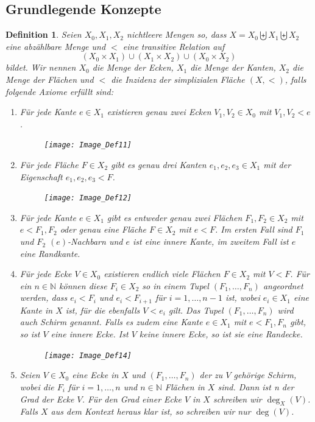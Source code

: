 \documentclass[12pt,titlepage,twoside,cleardoublepage]{article}
\theoremstyle{nummermitklammern}
\newtheorem{definition}[temp]{Definition}
\newtheorem{definition}[zahl]{Definition}
\numberwithin{equation}{section}
\begin{document}
\subsection{Grundlegende Konzepte}
\begin{definition}  \label{def1} 
Seien $X_0,X_1,X_2$ nichtleere Mengen so, dass $X=X_{0} \biguplus X_{1} \biguplus X_{2}$ eine abzählbare Menge und $<$ eine transitive Relation auf   
\[
(X_{0}\times X_{1}) \cup (X_{1}\times X_{2})\cup (X_{0}\times X_{2})
\]
 bildet.
 Wir nennen $X_{0}$ \emph{die Menge der Ecken}, $X_{1}$ \emph{die Menge der Kanten}, $X_{2}$ \emph{die Menge der Flächen} und $<$ die \emph{Inzidenz} der \emph{simplizialen Fläche} $(X,<)$, falls folgende Axiome erfüllt sind:
 \begin{enumerate}
\item Für jede Kante $e \in X_{1}$ existieren genau zwei Ecken $V_1,V_2 \in X_{0}$ mit $V_1,V_2 < e$. 
\begin{figure}[H]
\begin{center}
\texttt{[image: Image\_Def11]}
\end{center}
\end{figure}
\item Für jede Fläche $F\in X_2$ gibt es genau drei Kanten $e_1,e_2,e_3 \in X_{1}$ mit der Eigenschaft $e_1,e_2,e_3 < F$.
\begin{figure}[H]
\begin{center}
\texttt{[image: Image\_Def12]}
\end{center}
\end{figure} 
\item Für jede Kante $e \in X_{1}$ gibt es entweder genau zwei Flächen $F_{1},F_{2} \in X_{2}$ mit $e <F_{1},F_2$ oder
genau eine Fläche $F \in X_{2}$ mit $e < F$. Im ersten Fall sind $F_{1}$ und $F_{2}$ \emph{$(e)$-Nachbarn} und $e$ ist eine \emph{innere Kante}, im zweitem Fall ist $e$ eine \emph{Randkante}. 
 \item Für jede Ecke $V \in X_{0}$ existieren endlich viele Flächen $F\in X_{2}$ mit $V < F$.
  Für ein $n\in \mathbb{N}$ können diese $F_{i}\in X_2$ so in einem Tupel $(F_{1},\ldots,F_{n})$ angeordnet werden, dass $e_i<F_{i}$ und $e_i<F_{i+1}$ für $i=1,\ldots,n-1$ ist, wobei $e_i\in X_1$ eine Kante  in $X$ ist, für die ebenfalls $V<e_i$ gilt. 
  Das Tupel $(F_1,\ldots,F_n)$ wird auch \emph{Schirm} genannt. Falls es zudem eine Kante $e\in X_1$ mit $e<F_{1},F_{n}$ gibt, so ist $V$ eine \emph{innere Ecke}. Ist $V$ keine innere Ecke, so ist sie eine \emph{Randecke}.
\begin{figure}[H]
\begin{center}
\texttt{[image: Image\_Def14]}
\end{center}
\end{figure} 
 \item Seien $V \in X_0$ eine Ecke in $X$ und $(F_1,\ldots,F_n)$ der zu $V$ gehörige Schirm, wobei die $F_i$ für $i=1,\ldots ,n$ und $n\in \mathbb{N}$ Flächen in $X$ sind. Dann ist n der \emph{Grad der Ecke} $V$. Für den Grad einer Ecke $V$ in $X$ schreiben wir $\deg_X(V)$. Falls $X$ aus dem Kontext heraus klar ist, so schreiben wir nur $\deg(V)$.


\end{enumerate}
\end{definition}
\end{document}
